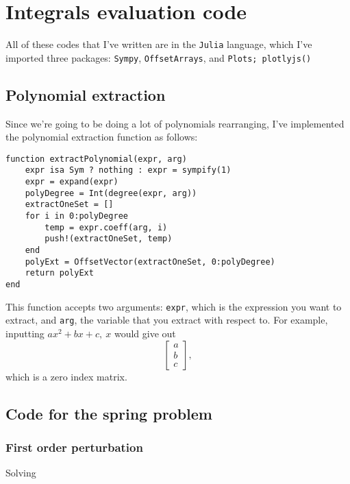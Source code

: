 \chapter{Integrals evaluation code}
\label{appendix:sympy_code_base}

All of these codes that I've written are in the \texttt{Julia} language, which I've imported three packages: \texttt{Sympy}, \texttt{OffsetArrays}, and \texttt{Plots; plotlyjs()}

\section{Polynomial extraction}

Since we're going to be doing a lot of polynomials rearranging, I've implemented the polynomial extraction function as follows:
\begin{verbatim}
function extractPolynomial(expr, arg)
    expr isa Sym ? nothing : expr = sympify(1)
    expr = expand(expr)
    polyDegree = Int(degree(expr, arg))
    extractOneSet = []
    for i in 0:polyDegree
        temp = expr.coeff(arg, i)
        push!(extractOneSet, temp)
    end
    polyExt = OffsetVector(extractOneSet, 0:polyDegree)
    return polyExt
end
\end{verbatim}
This function accepts two arguments: \texttt{expr}, which is the expression you want to extract, and \texttt{arg}, the variable that you extract with respect to. For example, inputting $ax^2 + bx + c,~x$ would give out
\begin{equation}
    \begin{bmatrix}
        a \\ b \\ c
    \end{bmatrix},
\end{equation}
which is a zero index matrix.

\section{Code for the spring problem}

\subsection{First order perturbation}

Solving